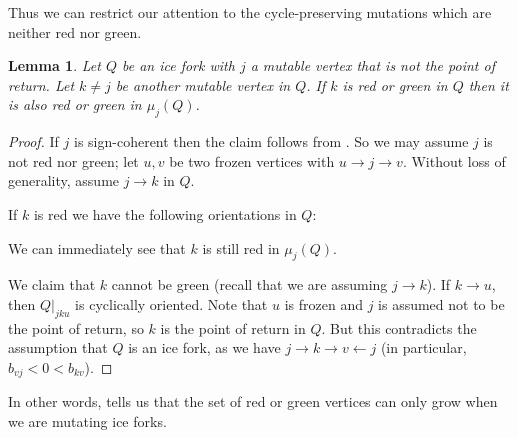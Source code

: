 \documentclass[12pt]{amsart}
\newtheorem{lem}[thm]{Lemma}
\theoremstyle{definition}
\theoremstyle{remark}
\numberwithin{equation}{section}
\begin{document}
Thus we can restrict our attention to the cycle-preserving mutations which are neither red nor green.

\begin{lem}
\label{lem: colors stay}
Let $Q$ be an ice fork with $j$ a mutable vertex that is not the point of return. 
Let $k \neq j$ be another mutable vertex in $Q$.
If $k$ is red or green in $Q$ then it is also red or green in $\mu_j(Q)$.
\end{lem}

\begin{proof}
If $j$ is sign-coherent then the claim follows from . So we may assume $j$ is not red nor green; let $u,v$ be two frozen vertices with $u \rightarrow j \rightarrow v$.
Without loss of generality, assume $j\rightarrow k$ in $Q$.

If $k$ is red we have the following orientations in $Q$:

\begin{center}
    
\end{center}
We can immediately see that $k$ is still red in $\mu_j(Q)$.

We claim that $k$ cannot be green (recall that we are assuming $j\rightarrow k$).  
If $k \rightarrow u$, then $Q|_{jku}$ is cyclically oriented. 
Note that $u$ is frozen and $j$ is assumed not to be the point of return, so $k$ is the point of return in $Q$.
But this contradicts the assumption that $Q$ is an ice fork, as we have $j \rightarrow k \rightarrow v \leftarrow j$ (in particular, $b_{vj} < 0 < b_{kv}$).
\end{proof}

In other words,  tells us that the set of red or green vertices can only grow when we are mutating ice forks.
\end{document}

